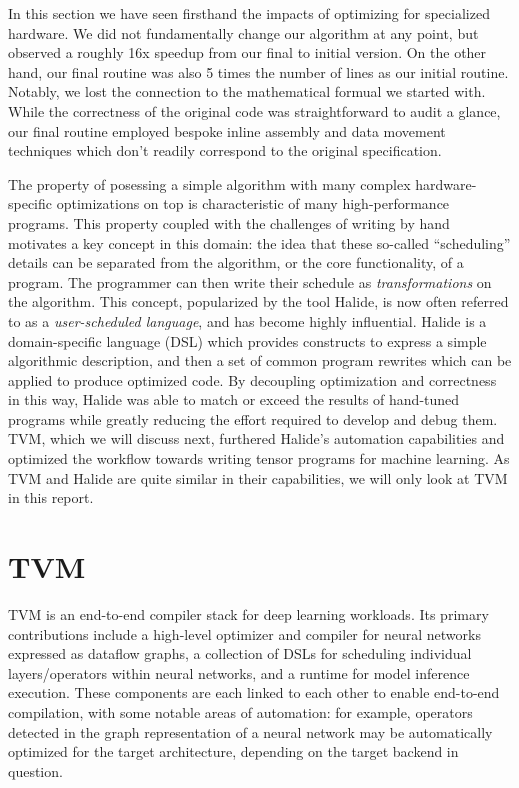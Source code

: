 \documentclass[acmsmall, nonacm=true]{acmart}
\begin{document}
In this section we have seen firsthand the impacts of optimizing for specialized hardware. We did not fundamentally change our algorithm at any point, but observed a roughly 16x speedup from our final to initial version. On the other hand, our final routine was also 5 times the number of lines as our initial routine. Notably, we lost the connection to the mathematical formual we started with. While the correctness of the original code was straightforward to audit a glance, our final routine employed bespoke inline assembly and data movement techniques which don't readily correspond to the original specification. 

The property of posessing a simple algorithm with many complex hardware-specific optimizations on top is characteristic of many high-performance programs. This property coupled with the challenges of writing by hand motivates a key concept in this domain: the idea that these so-called ``scheduling'' details can be separated from the algorithm, or the core functionality, of a program. The programmer can then write their schedule as \textit{transformations} on the algorithm. This concept, popularized by the tool Halide, is now often referred to as a \textit{user-scheduled language}, and has become highly influential. Halide is a domain-specific language (DSL) which provides constructs to express a simple algorithmic description, and then a set of common program rewrites which can be applied to produce optimized code. By decoupling optimization and correctness in this way, Halide was able to match or exceed the results of hand-tuned programs while greatly reducing the effort required to develop and debug them. TVM, which we will discuss next, furthered Halide's automation capabilities and optimized the workflow towards writing tensor programs for machine learning. As TVM and Halide are quite similar in their capabilities, we will only look at TVM in this report.




\section{TVM}

TVM\cite{tvm} is an end-to-end compiler stack for deep learning workloads. Its primary contributions include a high-level optimizer and compiler for neural networks expressed as dataflow graphs, a collection of DSLs for scheduling individual layers/operators within neural networks, and a runtime for model inference execution. These components are each linked to each other to enable end-to-end compilation, with some notable areas of automation: for example, operators detected in the graph representation of a neural network may be automatically optimized for the target architecture, depending on the target backend in question.
\end{document}
